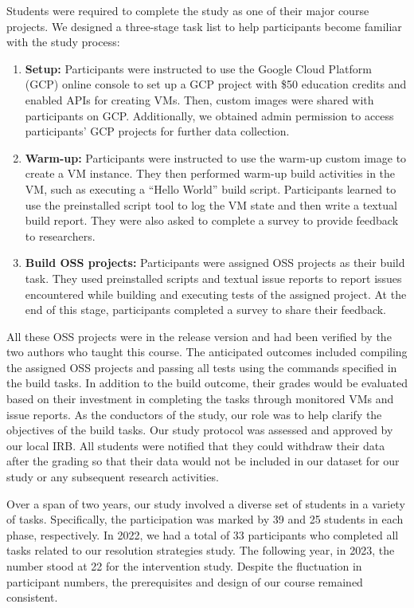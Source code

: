 \documentclass[10pt, conference]{IEEEtran}
\begin{document}
Students were required to complete the study as one of their major course projects. We designed a three-stage task list to help participants become familiar with the study process:

\begin{enumerate}[leftmargin=*]

\item \textbf{Setup:} Participants were instructed to use the Google Cloud Platform (GCP) online console to set up a GCP project with \$50 education credits and enabled APIs for creating VMs. Then, custom images were shared with participants on GCP. Additionally, we obtained admin permission to access participants' GCP projects for further data collection.

\item \textbf{Warm-up:} Participants were instructed to use the warm-up custom image to create a VM instance. They then performed warm-up build activities in the VM, such as executing a ``Hello World'' build script. Participants learned to use the preinstalled script tool to log the VM state and then write a textual build report. They were also asked to complete a survey to provide feedback to researchers.

\item \textbf{Build OSS projects:} Participants were assigned OSS projects as their build task. They used preinstalled scripts and textual issue reports to report issues encountered while building and executing tests of the assigned project. At the end of this stage, participants completed a survey to share their feedback.

\end{enumerate}

All these OSS projects were in the release version and had been verified by the two authors who taught this course. The anticipated outcomes included compiling the assigned OSS projects and passing all tests using the commands specified in the build tasks. In addition to the build outcome, their grades would be evaluated based on their investment in completing the tasks through monitored VMs and issue reports. As the conductors of the study, our role was to help clarify the objectives of the build tasks. Our study protocol was assessed and approved by our local IRB. All students were notified that they could withdraw their data after the grading so that their data would not be included in our dataset for our study or any subsequent research activities.

Over a span of two years, our study involved a diverse set of students in a variety of tasks. Specifically, the participation was marked by 39 and 25 students in each phase, respectively. In 2022, we had a total of 33 participants who completed all tasks related to our resolution strategies study. The following year, in 2023, the number stood at 22 for the intervention study. Despite the fluctuation in participant numbers, the prerequisites and design of our course remained consistent.
\end{document}
